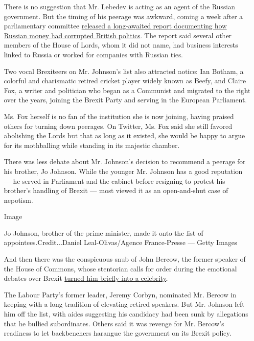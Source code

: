 There is no suggestion that Mr. Lebedev is acting as an agent of the
Russian government. But the timing of his peerage was awkward, coming a
week after a parliamentary committee
\href{https://www.nytimes.com/2020/07/21/world/europe/uk-russia-report-brexit-interference.html}{released
a long-awaited report documenting how Russian money had corrupted
British politics}. The report said several other members of the House of
Lords, whom it did not name, had business interests linked to Russia or
worked for companies with Russian ties.

Two vocal Brexiteers on Mr. Johnson's list also attracted notice: Ian
Botham, a colorful and charismatic retired cricket player widely known
as Beefy, and Claire Fox, a writer and politician who began as a
Communist and migrated to the right over the years, joining the Brexit
Party and serving in the European Parliament.

Ms. Fox herself is no fan of the institution she is now joining, having
praised others for turning down peerages. On Twitter, Ms. Fox said she
still favored abolishing the Lords but that as long as it existed, she
would be happy to argue for its mothballing while standing in its
majestic chamber.

There was less debate about Mr. Johnson's decision to recommend a
peerage for his brother, Jo Johnson. While the younger Mr. Johnson has a
good reputation --- he served in Parliament and the cabinet before
resigning to protest his brother's handling of Brexit --- most viewed it
as an open-and-shut case of nepotism.

Image

Jo Johnson, brother of the prime minister, made it onto the list of
appointees.Credit...Daniel Leal-Olivas/Agence France-Presse --- Getty
Images

And then there was the conspicuous snub of John Bercow, the former
speaker of the House of Commons, whose stentorian calls for order during
the emotional debates over Brexit
\href{https://www.nytimes.com/2019/10/31/world/europe/british-parliament-speaker-john-bercow-resigns.html}{turned
him briefly into a celebrity}.

The Labour Party's former leader, Jeremy Corbyn, nominated Mr. Bercow in
keeping with a long tradition of elevating retired speakers. But Mr.
Johnson left him off the list, with aides suggesting his candidacy had
been sunk by allegations that he bullied subordinates. Others said it
was revenge for Mr. Bercow's readiness to let backbenchers harangue the
government on its Brexit policy.

